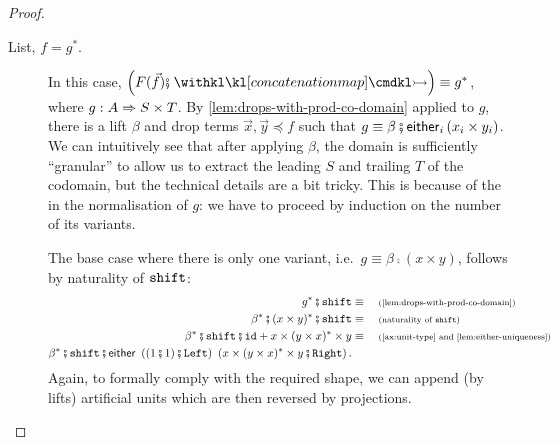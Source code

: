 \begin{proof}
\begin{description}
\begin{description}
            \item[List, $f = g^*$.] In this case, $\left(F(\vec f) \comp \concmap \right) \equiv g^*$, where $g : A \Rightarrow S \times T$. By \cref{lem:drops-with-prod-co-domain} applied to $g$, there is a lift $\beta$ and drop terms $\vec x, \vec y \preceq f$ such that $g \equiv \beta \comp \eithermany{i}{(x_i \times y_i)}$. We can intuitively see that after applying $\beta$, the domain is sufficiently ``granular'' to allow us to extract the leading $S$ and trailing $T$ of the codomain, but the technical details are a bit tricky. This is because of the  in the normalisation of $g$: we have to proceed by induction on the number of its variants. 
            
            The base case where there is only one variant, i.e.~$g \equiv \beta \comp (x \times y)$, follows by naturality of $\mathtt{shift}$:
            \begin{align*}
                g^* \comp \shiftterm \equalbecause{\cref{lem:drops-with-prod-co-domain}} \\ 
                \beta^* \comp (x \times y)^* \comp \shiftterm \equalbecause{naturality of $\shiftterm$} \\
                \beta^* \comp \shiftterm \comp \idterm + x \times (y \times x)^* \times y \equalbecause{\cref{ax:unit-type} and \cref{lem:either-uniqueness}} \\ 
                \beta^* \comp \shiftterm \comp \either{\left( (1 \comp 1) \comp \leftterm \right)}{\left( x \times (y \times x)^* \times y \comp \rightterm \right)}.
            \end{align*}
            Again, to formally comply with the required shape, we can append (by lifts) artificial units which are then reversed by projections. 


\end{description}
\end{description}
\end{proof}
